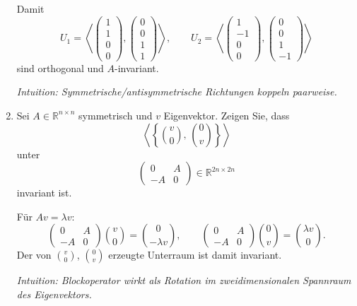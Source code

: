 \documentclass[11pt, a4paper]{article}
\begin{document}
\begin{enumerate}
\begin{framed}
\[  \]
  Damit
  \[
    U_1=\left\langle \begin{pmatrix}1\\1\\0\\0\end{pmatrix},
                       \begin{pmatrix}0\\0\\1\\1\end{pmatrix}\right\rangle,\qquad
    U_2=\left\langle \begin{pmatrix}1\\-1\\0\\0\end{pmatrix},
                       \begin{pmatrix}0\\0\\1\\-1\end{pmatrix}\right\rangle
  \]
  sind orthogonal und $A$-invariant.

  \medskip\noindent\textit{Intuition: Symmetrische/antisymmetrische Richtungen koppeln paarweise.}
  \end{framed}

  \item Sei $A\in\mathbb{R}^{n\times n}$ symmetrisch und $v$ Eigenvektor. Zeigen Sie, dass
  \[
    \left\langle \left\{ \binom{v}{0},\,\binom{0}{v} \right\} \right\rangle
  \]
  unter
  \[
    \begin{pmatrix}0&A\\ -A&0\end{pmatrix}\in\mathbb{R}^{2n\times 2n}
  \]
  invariant ist.
  \begin{framed}
  Für $Av=\lambda v$:
  \[
    \begin{pmatrix}0&A\\-A&0\end{pmatrix}\!\binom{v}{0}
      =\binom{0}{-\lambda v},\qquad
    \begin{pmatrix}0&A\\-A&0\end{pmatrix}\!\binom{0}{v}
      =\binom{\lambda v}{0}.
  \]
  Der von $\binom{v}{0}$, $\binom{0}{v}$ erzeugte Unterraum ist damit invariant.

  \medskip\noindent\textit{Intuition: Blockoperator wirkt als Rotation im zweidimensionalen Spannraum des Eigenvektors.}
  \end{framed}
\end{enumerate}

\vspace{0.5em}
\end{document}
